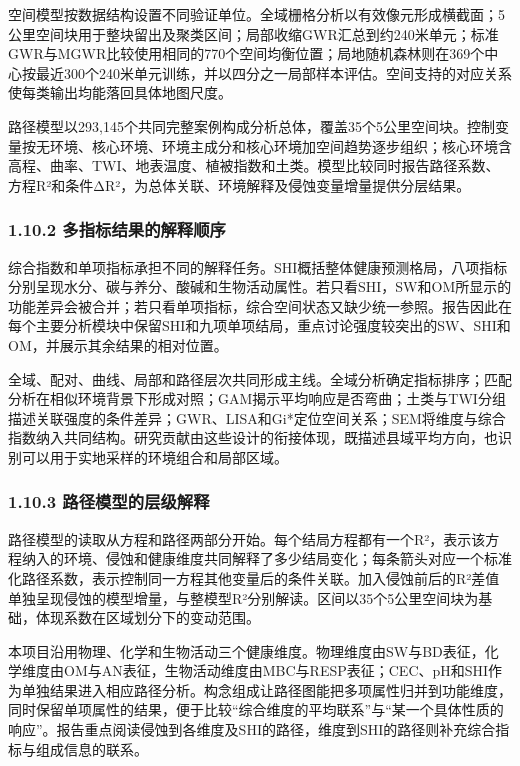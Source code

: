 \documentclass[
  11pt,
  a4paper,
]{ctexart}
\begin{document}
空间模型按数据结构设置不同验证单位。全域栅格分析以有效像元形成横截面；5公里空间块用于整块留出及聚类区间；局部收缩GWR汇总到约240米单元；标准GWR与MGWR比较使用相同的770个空间均衡位置；局地随机森林则在369个中心按最近300个240米单元训练，并以四分之一局部样本评估。空间支持的对应关系使每类输出均能落回具体地图尺度。

路径模型以293,145个共同完整案例构成分析总体，覆盖35个5公里空间块。控制变量按无环境、核心环境、环境主成分和核心环境加空间趋势逐步组织；核心环境含高程、曲率、TWI、地表温度、植被指数和土类。模型比较同时报告路径系数、方程R²和条件ΔR²，为总体关联、环境解释及侵蚀变量增量提供分层结果。

\hypertarget{ux591aux6307ux6807ux7ed3ux679cux7684ux89e3ux91caux987aux5e8f}{%
\subsubsection{1.10.2
多指标结果的解释顺序}\label{ux591aux6307ux6807ux7ed3ux679cux7684ux89e3ux91caux987aux5e8f}}

综合指数和单项指标承担不同的解释任务。SHI概括整体健康预测格局，八项指标分别呈现水分、碳与养分、酸碱和生物活动属性。若只看SHI，SW和OM所显示的功能差异会被合并；若只看单项指标，综合空间状态又缺少统一参照。报告因此在每个主要分析模块中保留SHI和九项单项结局，重点讨论强度较突出的SW、SHI和OM，并展示其余结果的相对位置。

全域、配对、曲线、局部和路径层次共同形成主线。全域分析确定指标排序；匹配分析在相似环境背景下形成对照；GAM揭示平均响应是否弯曲；土类与TWI分组描述关联强度的条件差异；GWR、LISA和Gi*定位空间关系；SEM将维度与综合指数纳入共同结构。研究贡献由这些设计的衔接体现，既描述县域平均方向，也识别可以用于实地采样的环境组合和局部区域。

\hypertarget{ux8defux5f84ux6a21ux578bux7684ux5c42ux7ea7ux89e3ux91ca}{%
\subsubsection{1.10.3
路径模型的层级解释}\label{ux8defux5f84ux6a21ux578bux7684ux5c42ux7ea7ux89e3ux91ca}}

路径模型的读取从方程和路径两部分开始。每个结局方程都有一个R²，表示该方程纳入的环境、侵蚀和健康维度共同解释了多少结局变化；每条箭头对应一个标准化路径系数，表示控制同一方程其他变量后的条件关联。加入侵蚀前后的R²差值单独呈现侵蚀的模型增量，与整模型R²分别解读。区间以35个5公里空间块为基础，体现系数在区域划分下的变动范围。

本项目沿用物理、化学和生物活动三个健康维度。物理维度由SW与BD表征，化学维度由OM与AN表征，生物活动维度由MBC与RESP表征；CEC、pH和SHI作为单独结果进入相应路径分析。构念组成让路径图能把多项属性归并到功能维度，同时保留单项属性的结果，便于比较``综合维度的平均联系''与``某一个具体性质的响应''。报告重点阅读侵蚀到各维度及SHI的路径，维度到SHI的路径则补充综合指标与组成信息的联系。
\end{document}
